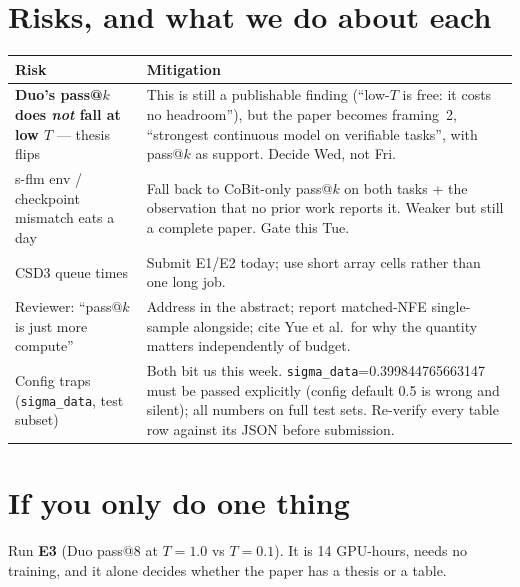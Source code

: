\documentclass[11pt,a4paper]{article}
\begin{document}
\section{Risks, and what we do about each}

\begin{center}\small
\begin{tabular}{@{}p{5.3cm}p{9.3cm}@{}}
\toprule
Risk & Mitigation \\ \midrule
\textbf{Duo's pass@$k$ does \emph{not} fall at low $T$} --- thesis flips &
This is still a publishable finding (``low-$T$ is free: it costs no headroom''), but the paper
becomes framing~2, ``strongest continuous model on verifiable tasks'', with pass@$k$ as support.
Decide Wed, not Fri. \\[2pt]
s-flm env / checkpoint mismatch eats a day &
Fall back to CoBit-only pass@$k$ on both tasks + the observation that no prior work reports it.
Weaker but still a complete paper. Gate this Tue. \\[2pt]
CSD3 queue times &
Submit E1/E2 today; use short array cells rather than one long job. \\[2pt]
Reviewer: ``pass@$k$ is just more compute'' &
Address in the abstract; report matched-NFE single-sample alongside; cite Yue et al.\ for why
the quantity matters independently of budget. \\[2pt]
Config traps (\texttt{sigma\_data}, test subset) &
Both bit us this week. \texttt{sigma\_data}=0.399844765663147 must be passed explicitly (config
default 0.5 is wrong and silent); all numbers on full test sets. Re-verify every table row against
its JSON before submission. \\
\bottomrule
\end{tabular}
\end{center}

\section*{If you only do one thing}

Run \textbf{E3} (Duo pass@8 at $T{=}1.0$ vs $T{=}0.1$). It is 14 GPU-hours, needs no training,
and it alone decides whether the paper has a thesis or a table.
\end{document}
